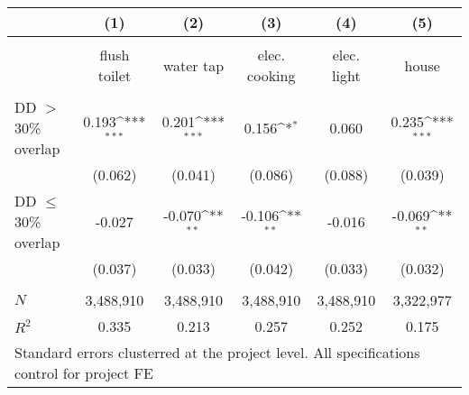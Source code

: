 {
\def\sym#1{\ifmmode^{#1}\else\(^{#1}\)\fi}
\begin{tabular}{l*{5}{c}}
 & (1) & (2) & (3) & (4) & (5)  \\[0.2em]
\hline\\[-0.9em]

                           &   flush toilet   &   water tap     &   elec. cooking  &   elec. light &  house\\
[0.2em]\hline \\[-0.9em]

DD $>$30\% overlap         &    0.193\sym{***}&   0.201\sym{***}&    0.156\sym{*}  &    0.060      &    0.235\sym{***}\\
                           &  (0.062)         &  (0.041)        &  (0.086)         &  (0.088)      &  (0.039)         \\
[0.5em]
DD $\leq$30\% overlap      &   -0.027         & -0.070\sym{**}  &   -0.106\sym{**} &   -0.016      &   -0.069\sym{**} \\
                           &  (0.037)         &  (0.033)        &  (0.042)         &  (0.033)      &  (0.032)         \\
\hline \\[-0.9em]    
\(N\)                      &  3,488,910       &  3,488,910      &  3,488,910       &  3,488,910    &  3,322,977         \\
\(R^{2}\)                  &    0.335         &    0.213        &    0.257        &    0.252       &    0.175         \\
\hline
\multicolumn{6}{l}{\tiny Standard errors clusterred at the project level. All specifications control for project FE}
\end{tabular}
}
